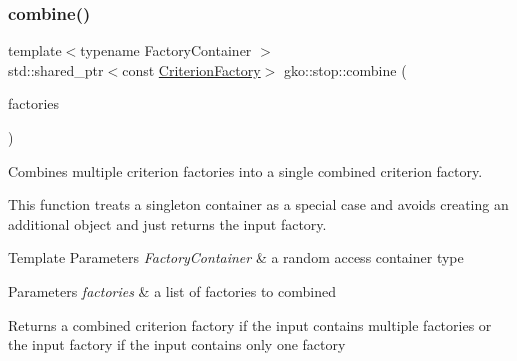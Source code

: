\subsubsection{\texorpdfstring{combine()}{combine()}}
{\footnotesize\ttfamily template$<$typename Factory\+Container $>$ \\
std\+::shared\+\_\+ptr$<$const \hyperlink{namespacegko_1_1stop_ab12a51109c50b35ec36dc5a393d6a9a0}{Criterion\+Factory}$>$ gko\+::stop\+::combine (\begin{DoxyParamCaption}\item[{Factory\+Container \&\&}]{factories }\end{DoxyParamCaption})}



Combines multiple criterion factories into a single combined criterion factory. 

This function treats a singleton container as a special case and avoids creating an additional object and just returns the input factory.


\begin{DoxyTemplParams}{Template Parameters}
{\em Factory\+Container} & a random access container type\\
\hline
\end{DoxyTemplParams}

\begin{DoxyParams}{Parameters}
{\em factories} & a list of factories to combined\\
\hline
\end{DoxyParams}
\begin{DoxyReturn}{Returns}
a combined criterion factory if the input contains multiple factories or the input factory if the input contains only one factory 
\end{DoxyReturn}
